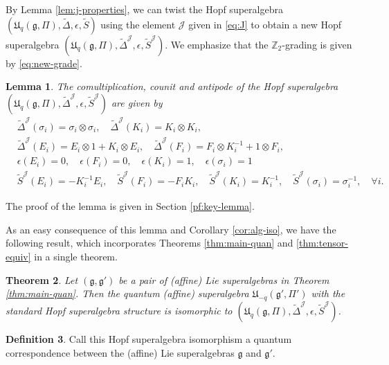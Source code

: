 \documentclass[12pt]{amsart}
\newtheorem{theorem}{Theorem}[section]
\newtheorem{lemma}[theorem]{Lemma}
\theoremstyle{definition}
\newtheorem{definition}[theorem]{Definition}
\theoremstyle{remark}
\numberwithin{equation}{section}
\begin{document}
By Lemma \ref{lem:j-properties}, we can twist the Hopf superalgebra $({{\mathfrak U}}_q({{\mathfrak g}}, \Pi), \tilde{\Delta}, \epsilon, \tilde{S})$ using the element ${{\mathcal J}}$ given in \eqref{eq:J} to obtain a new Hopf superalgebra $({{\mathfrak U}}_q({{\mathfrak g}}, \Pi), \tilde{\Delta}^{{\mathcal J}}, \epsilon, \tilde{S}^{{\mathcal J}})$. We emphasize that the ${{\mathbb Z}}_2$-grading is given by \eqref{eq:new-grade}.

\begin{lemma}\label{lem:tilde-Delta}
The comultiplication, counit and antipode of the Hopf superalgebra $({{\mathfrak U}}_q({{\mathfrak g}}, \Pi), \tilde{\Delta}^{{\mathcal J}}, \epsilon, \tilde{S}^{{\mathcal J}})$ are given by
\[
\begin{aligned}
&\tilde{\Delta}^{{\mathcal J}}(\sigma_i)=\sigma_i\otimes\sigma_i, \quad \tilde{\Delta}^{{\mathcal J}}(K_i)=K_i\otimes K_i, \\
&\tilde{\Delta}^{{\mathcal J}}(E_i)=E_i\otimes 1 + K_i  \otimes E_i, \quad \tilde{\Delta}^{{\mathcal J}}(F_i)=F_i\otimes K^{-1}_i + 1 \otimes F_i, \\
&\epsilon(E_i)=0, \quad \epsilon(F_i)=0, \quad \epsilon(K_i)=1,   \quad \epsilon(\sigma_i)=1\\
&\tilde{S}^{{\mathcal J}}(E_i)=- K^{-1}_i E_i, \quad \tilde{S}^{{\mathcal J}}(F_i)=- F_i K_i , \quad \tilde{S}^{{\mathcal J}}(K_i)=K^{-1}_i, \quad \tilde{S}^{{\mathcal J}}(\sigma_i)=\sigma^{-1}_i, \quad \forall i.
\end{aligned}
\]
\end{lemma}
The proof of the lemma is given in Section \ref{pf:key-lemma}.

As an easy consequence of this lemma and Corollary \ref{cor:alg-iso},
we have the following result, which incorporates Theorems \ref{thm:main-quan} and \ref{thm:tensor-equiv} in a single theorem.
\begin{theorem}\label{them: hopf connection}
Let $({{\mathfrak g}}, {{\mathfrak g}}')$ be a pair of (affine) Lie superalgebras  in Theorem \ref{thm:main-quan}. Then the quantum (affine) superalgebra ${{\mathfrak U}}_{-q}({{\mathfrak g}}',\Pi')$ with the standard Hopf superalgebra structure is isomorphic to $({{\mathfrak U}}_q({{\mathfrak g}}, \Pi), \tilde{\Delta}^{{\mathcal J}}, \epsilon, \tilde{S}^{{\mathcal J}})$.
\end{theorem}

\begin{definition}\label{def:correspond} Call this Hopf superalgebra isomorphism a quantum correspondence between the (affine) Lie superalgebras ${{\mathfrak g}}$ and ${{\mathfrak g}}'$.
\end{definition}
\end{document}
